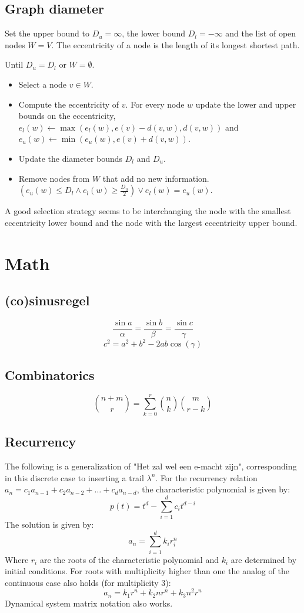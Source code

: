\documentclass[10pt,hidelinks]{article}
\begin{document}
\subsection{Graph diameter}
Set the upper bound to $D_u = \infty$, the lower bound $D_l = -\infty$ and the
list of open nodes $W = V$. The eccentricity of a node is the length of its
longest shortest path.

Until $D_u = D_l$ or $W = \emptyset$.
\begin{itemize}
	\item Select a node $v \in W$.
	\item Compute the eccentricity of $v$. For every node $w$ update the lower
		and upper bounds on the eccentricity, $e_l(w) \leftarrow \max(e_l(w),
		e(v) - d(v, w), d(v, w))$ and $e_u(w) \leftarrow \min(e_u(w), e(v)
		+ d(v, w))$.
	\item Update the diameter bounds $D_l$ and $D_u$.
	\item Remove nodes from $W$ that add no new information.
		$(e_u(w) \leq D_l \land e_l(w) \geq \frac{D_u}{2}) \lor e_l(w) =
		e_u(w)$.
\end{itemize}

A good selection strategy seems to be interchanging the node with the smallest
eccentricity lower bound and the node with the largest eccentricity upper bound.

\section{Math}


\subsection{(co)sinusregel}

\[\frac{\sin a}{\alpha} = \frac{\sin b}{\beta} =\frac{\sin c}{\gamma}\]
\[c^2=a^2+b^2-2ab\cos(\gamma)\]

\subsection{Combinatorics}

\[\binom{n+m}{r} = \sum_{k=0}^r \binom{n}{k} \binom{m}{r-k}\]

\subsection{Recurrency}
The following is a generalization of "Het zal wel een e-macht zijn", corresponding in this discrete case to inserting a trail $\lambda^n$.
For the recurrency relation $a_n = c_1a_{n-1} + c_2a_{n-2} + \dots + c_da_{n-d}$, the characteristic polynomial is given by:
\[p(t) = t^d - \sum_{i=1}^d c_it^{d-i}\]
The solution is given by:
\[a_n = \sum_{i=1}^d k_ir_i^n\]
Where $r_i$ are the roots of the characteristic polynomial and $k_i$ are determined by initial conditions. For roots with multiplicity higher than one the analog of the continuous case also holds (for multiplicity 3):
\[a_n = k_1r^n+k_2nr^n+k_3n^2r^n\]
Dynamical system matrix notation also works.
\end{document}
